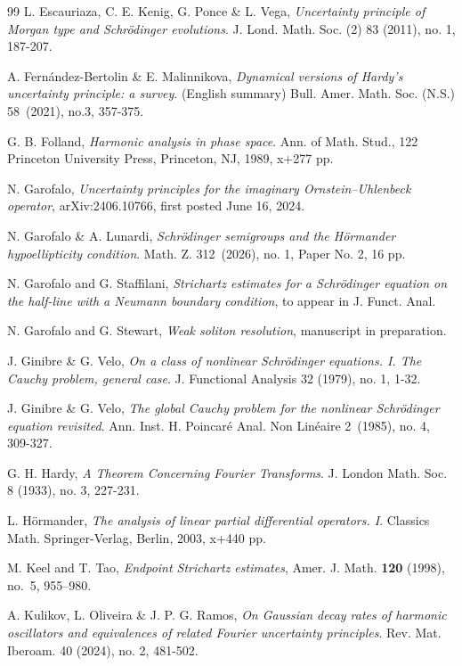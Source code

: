 \documentclass[11pt,a4paper]{amsart}
\numberwithin{equation}{section}
\numberwithin{equation}{section}
\begin{document}
\begin{thebibliography}{99}
L. Escauriaza, C. E. Kenig, G. Ponce \& L. Vega, \emph{ Uncertainty principle of Morgan type and Schr\"odinger evolutions}.
J. Lond. Math. Soc. (2) 83 (2011), no. 1, 187-207.

A. Fern\'andez-Bertolin \& E. Malinnikova, 
\emph{Dynamical versions of Hardy's uncertainty principle: a survey}. (English summary)
Bull. Amer. Math. Soc. (N.S.) 58~(2021), no.3, 357-375.

G. B. Folland, \emph{Harmonic analysis in phase space}.
Ann. of Math. Stud., 122
Princeton University Press, Princeton, NJ, 1989, x+277 pp.

N. Garofalo,
\emph{Uncertainty principles for the imaginary Ornstein--Uhlenbeck operator},
arXiv:2406.10766, first posted June 16, 2024.

N. Garofalo \& A. Lunardi, \emph{Schr\"odinger semigroups and the H\"ormander hypoellipticity condition}.
Math. Z. 312~(2026), no. 1, Paper No. 2, 16 pp.

N. Garofalo and G. Staffilani,
\emph{Strichartz estimates for a Schr\"odinger equation on the half-line with a Neumann boundary condition},
to appear in J. Funct. Anal.

N. Garofalo and G. Stewart,
\emph{Weak soliton resolution}, manuscript in preparation.

J. Ginibre \& G. Velo, \emph{On a class of nonlinear Schr\"odinger equations. I. The Cauchy problem, general case}.
J. Functional Analysis 32 (1979), no. 1, 1-32.

J. Ginibre \& G. Velo, \emph{The global Cauchy problem for the nonlinear Schr\"odinger equation revisited}.
Ann. Inst. H. Poincar\'e Anal. Non Lin\'eaire 2~(1985), no. 4, 309-327.

G. H. Hardy, \emph{A Theorem Concerning Fourier Transforms}.
J. London Math. Soc. 8 (1933), no. 3, 227-231.

L. H{\"o}rmander,
\textit{The analysis of linear partial differential operators. I}.
Classics Math.
Springer-Verlag, Berlin, 2003, x+440 pp.

M. Keel and T. Tao,
\emph{Endpoint Strichartz estimates},
Amer. J. Math. \textbf{120} (1998), no.~5, 955--980.

A. Kulikov, L. Oliveira \& J. P. G. Ramos, \emph{On Gaussian decay rates of harmonic oscillators and equivalences of related Fourier uncertainty principles}.
Rev. Mat. Iberoam. 40 (2024), no. 2, 481-502.


\end{thebibliography}
\end{document}
